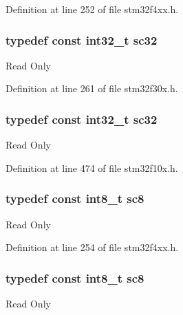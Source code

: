 Definition at line 252 of file stm32f4xx.\-h.

\hypertarget{group___exported__types_gad97679599f3791409523fdb1c6156a28}{
\subsubsection[{sc32}]{\setlength{\rightskip}{0pt plus 5cm}typedef {\bf const} {\bf int32\-\_\-t} {\bf sc32}}}\label{group___exported__types_gad97679599f3791409523fdb1c6156a28}
Read Only 

Definition at line 261 of file stm32f30x.\-h.

\hypertarget{group___exported__types_gad97679599f3791409523fdb1c6156a28}{
\subsubsection[{sc32}]{\setlength{\rightskip}{0pt plus 5cm}typedef {\bf const} {\bf int32\-\_\-t} {\bf sc32}}}\label{group___exported__types_gad97679599f3791409523fdb1c6156a28}
Read Only 

Definition at line 474 of file stm32f10x.\-h.

\hypertarget{group___exported__types_ga30e6c0f6718e1b6d26dc9d94ddcf9d11}{
\subsubsection[{sc8}]{\setlength{\rightskip}{0pt plus 5cm}typedef {\bf const} {\bf int8\-\_\-t} {\bf sc8}}}\label{group___exported__types_ga30e6c0f6718e1b6d26dc9d94ddcf9d11}
Read Only 

Definition at line 254 of file stm32f4xx.\-h.

\hypertarget{group___exported__types_ga30e6c0f6718e1b6d26dc9d94ddcf9d11}{
\subsubsection[{sc8}]{\setlength{\rightskip}{0pt plus 5cm}typedef {\bf const} {\bf int8\-\_\-t} {\bf sc8}}}\label{group___exported__types_ga30e6c0f6718e1b6d26dc9d94ddcf9d11}
Read Only 

